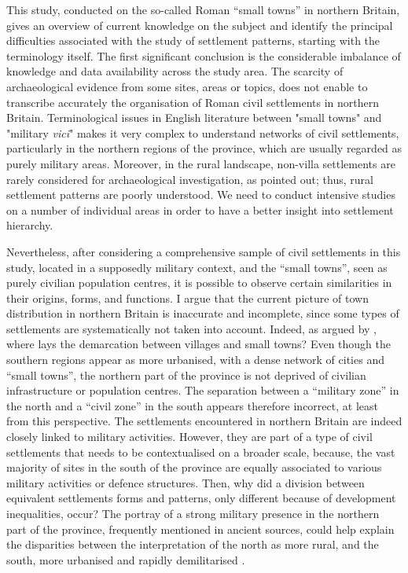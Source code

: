 This study, conducted on the so-called Roman “small towns” in northern Britain, gives an overview of current knowledge on the subject and identify the principal difficulties associated with the study of settlement patterns, starting with the terminology itself. The first significant conclusion is the considerable imbalance of knowledge and data availability across the study area. The scarcity of archaeological evidence from some sites, areas or topics, does not enable to transcribe accurately the organisation of Roman civil settlements in northern Britain. Terminological issues in English literature between "small towns" and "military \textit{vici}" makes it very complex to understand networks of civil settlements, particularly in the northern regions of the province, which are usually regarded as purely military areas. Moreover, in the rural landscape, non-villa settlements are rarely considered for archaeological investigation, as \textcite[76]{Hingley_1991} pointed out; thus, rural settlement patterns are poorly understood. We need to conduct intensive studies on a number of individual areas in order to have a better insight into settlement hierarchy.

Nevertheless, after considering a comprehensive sample of civil settlements in this study, located in a supposedly military context, and the “small towns”, seen as purely civilian population centres, it is possible to observe certain similarities in their origins, forms, and functions. I argue that the current picture of town distribution in northern Britain is inaccurate and incomplete, since some types of settlements are systematically not taken into account. Indeed, as argued by \textcite[76]{Jones_1991}, where lays the demarcation between villages and small towns? Even though the southern regions appear as more urbanised, with a dense network of cities and “small towns”, the northern part of the province is not deprived of civilian infrastructure or population centres. The separation between a “military zone” in the north and a “civil zone” in the south appears therefore incorrect, at least from this perspective. The settlements encountered in northern Britain are indeed closely linked to military activities. However, they are part of a type of civil settlements that needs to be contextualised on a broader scale, because, the vast majority of sites in the south of the province are equally associated to various military activities or defence structures. Then, why did a division between equivalent settlements forms and patterns, only different because of development inequalities, occur? The portray of a strong military presence in the northern part of the province, frequently mentioned in ancient sources, could help explain the disparities between the interpretation of the north as more rural, and the south, more urbanised and rapidly demilitarised \parencite[291]{Mattingly_2006}.

